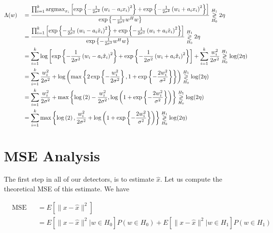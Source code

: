 \documentclass[english]{article}
\begin{document}
\begin{equation}\label{eq:opt det}
\begin{aligned}
&\Lambda(w)
&& = \frac{\prod_{i=1}^k\mathop{\rm argmax}_{x_i}\left[\exp\left\{-\frac{1}{2\sigma^2}\left(w_i-a_ix_i\right)^2\right\}+\exp\left\{-\frac{1}{2\sigma^2}\left(w_i+a_ix_i\right)^2\right\}\right]}{\exp\left\{-\frac{1}{2\sigma^2}w^Hw\right\}} \overset{H_1}{\underset{H_0}{\gtrless}} 2\eta\\
&&&=\frac{\prod_{i=1}^k\left[\exp\left\{-\frac{1}{2\sigma^2}\left(w_i-a_i\hat{x}_i\right)^2\right\}+\exp\left\{-\frac{1}{2\sigma^2}\left(w_i+a_i\hat{x}_i\right)^2\right\}\right]}{\exp\left\{-\frac{1}{2\sigma^2}w^Hw\right\}} \overset{H_1}{\underset{H_0}{\gtrless}} 2\eta\\
&&&=\sum_{i=1}^k\log\left[\exp\left\{-\frac{1}{2\sigma^2}\left(w_i-a_i\hat{x}_i\right)^2\right\}+\exp\left\{-\frac{1}{2\sigma^2}\left(w_i+a_i\hat{x}_i\right)^2\right\}\right] +\sum_{i=1}^k\frac{w_i^2}{2\sigma^2} \overset{H_1}{\underset{H_0}{\gtrless}} \log(2\eta)\\
&&&=\sum_{i=1}^k\frac{w_i^2}{2\sigma^2}+\log\left(\max\left\{2\exp\left\{-\frac{w_i^2}{2\sigma^2}\right\} , 1 + \exp\left\{-\frac{2w_i^2}{\sigma^2}\right\}\right\}\right)\overset{H_1}{\underset{H_0}{\gtrless}} \log(2\eta)\\
&&&=\sum_{i=1}^k\frac{w_i^2}{2\sigma^2}+\max\left\{\log\left(2\right)-\frac{w_i^2}{2\sigma^2} , \log\left(1 + \exp\left\{-\frac{2w_i^2}{\sigma^2}\right\}\right)\right\}\overset{H_1}{\underset{H_0}{\gtrless}} \log(2\eta)\\
&&&=\sum_{i=1}^k\max\left\{\log\left(2\right), \frac{w_i^2}{2\sigma^2}+\log\left(1 + \exp\left\{-\frac{2w_i^2}{\sigma^2}\right\}\right)\right\}\overset{H_1}{\underset{H_0}{\gtrless}} \log(2\eta)\\
\end{aligned}
\end{equation}

\section{MSE Analysis}
The first step in all of our detectors, is to estimate $\hat{x}$. Let us compute the theoretical MSE of this estimate. We have

\begin{equation}
\begin{aligned}
&\text{MSE}
&&=E[\|x-\hat{x}\|^2]\\
&&&=E[\|x-\hat{x}\|^2|w\in H_0]P(w\in H_0) + E[\|x-\hat{x}\|^2| w\in H_1]P(w\in H_1)\\
\end{aligned}
\end{equation}
\end{document}
